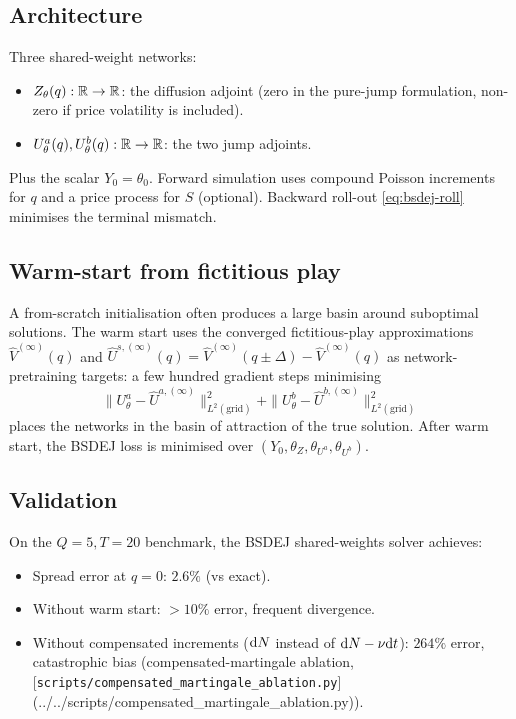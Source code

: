 \subsection{Architecture}

Three shared-weight networks:
\begin{itemize}
  \item $Z_\theta(q) : \mathbb{R} \to \mathbb{R}$: the diffusion adjoint (zero in the pure-jump formulation, non-zero if price volatility is included).
  \item $U^a_\theta(q), U^b_\theta(q) : \mathbb{R} \to \mathbb{R}$: the two jump adjoints.
\end{itemize}
Plus the scalar $Y_0 = \theta_0$. Forward simulation uses compound Poisson increments for $q$ and a price process for $S$ (optional). Backward roll-out \eqref{eq:bsdej-roll} minimises the terminal mismatch.

\subsection{Warm-start from fictitious play}

A from-scratch initialisation often produces a large basin around suboptimal solutions. The warm start uses the converged fictitious-play approximations $\hat V^{(\infty)}(q)$ and $\hat U^{s, (\infty)}(q) = \hat V^{(\infty)}(q \pm \Delta) - \hat V^{(\infty)}(q)$ as network-pretraining targets: a few hundred gradient steps minimising
\[
  \|U^a_\theta - \hat U^{a, (\infty)}\|^2_{L^2(\text{grid})} + \|U^b_\theta - \hat U^{b, (\infty)}\|^2_{L^2(\text{grid})}
\]
places the networks in the basin of attraction of the true solution. After warm start, the BSDEJ loss is minimised over $(Y_0, \theta_Z, \theta_{U^a}, \theta_{U^b})$.

\subsection{Validation}

On the $Q = 5, T = 20$ benchmark, the BSDEJ shared-weights solver achieves:
\begin{itemize}
  \item Spread error at $q = 0$: $2.6\%$ (vs exact).
  \item Without warm start: $> 10\%$ error, frequent divergence.
  \item Without compensated increments ($\mathrm{d} N$ instead of $\mathrm{d} N - \nu \mathrm{d} t$): $264\%$ error, catastrophic bias (compensated-martingale ablation, [\texttt{scripts/compensated\_martingale\_ablation.py}](../../scripts/compensated_martingale_ablation.py)).
\end{itemize}

